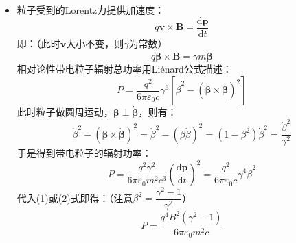\documentclass[a4paper,fontset=none]{ctexart}
\begin{document}
\begin{itemize}
\begin{align*}
        &= \frac{F^2}{\delta^2} - \frac{1}{\delta^2} (\bm{\beta} \cdot \bm{F})^2 - \frac{1}{\gamma^2} \left[(\hat{r} \cdot \bm{F})^2 + (\bm{\beta} \cdot \bm{F})^2 - 2 (\hat{r} \cdot \bm{F}) (\bm{\beta} \cdot \bm{F})\right] \\
        &= \frac{\bm{F}^2}{\delta^2} - \frac{1}{\delta^2}(\bm{\beta} \cdot \bm{F})^2 - \frac{1}{\gamma^2}(\hat{r} \cdot \bm{F} - \bm{\beta} \cdot \bm{F})^2
    \end{align*}
    故带电粒子辐射功率的角分布公式：
    \[
        \frac{\mathrm{d}P}{\mathrm{d}\varOmega} = \frac{q^2}{16\pi^2\varepsilon_0c^3} \frac{\left[\hat{r} \times (\hat{r}-\bm{\beta}) \times \dot{\bm{v}}\right]^2}{(1 - \bm{\beta} \cdot \hat{r})^5} = \frac{q^2}{16\pi^2\varepsilon_0c^3} \cdot \delta^5\left[\hat{r} \times (\hat{r}-\bm{\beta}) \times \dot{\bm{v}}\right]^2
    \]
    用作用力可以表示为：
    \[
        \frac{\mathrm{d}P}{\mathrm{d}\varOmega} = \frac{q^2}{16\pi^2\varepsilon_0c^3} \cdot \frac{\delta^3}{\gamma^2m^2}\left[\bm{F}^2 - (\bm{\beta} \cdot \bm{F})^2 - \frac{\delta^2}{\gamma^2}(\hat{r} \cdot \bm{F} - \bm{\beta} \cdot \bm{F})^2\right]
    \]
    其中$\delta=\dfrac{1}{1-\hat{r}\cdot\bm{\beta}}$。

    \item[9.(1)]
    \setcounter{equation}{0}
    粒子受到的Lorentz力提供加速度：
    \begin{equation}
        q\bm{v} \times \bm{B} = \frac{\mathrm{d}\bm{p}}{\mathrm{d}t}
    \end{equation}
    即：（此时$\bm{v}$大小不变，则$\gamma$为常数）
    \begin{equation}
        q\bm{\beta} \times \bm{B} = \gamma m\dot{\bm{\beta}}
    \end{equation}
    相对论性带电粒子辐射总功率用Li\'{e}nard公式描述：
    \[
        P = \frac{q^2}{6\pi\varepsilon_0c}\gamma^6\left[\dot{\beta}^2 - (\bm{\beta} \times \dot{\bm{\beta}})^2\right]
    \]
    此时粒子做圆周运动，$\bm{\beta}\perp\dot{\bm{\beta}}$，则有：
    \[
        \dot{\beta}^2 - (\bm{\beta} \times \dot{\bm{\beta}})^2 = \dot{\beta}^2 - (\beta\dot{\beta})^2 = (1 - \beta^2)\dot{\beta}^2 = \frac{\dot{\beta}^2}{\gamma^2}
    \]
    于是得到带电粒子的辐射功率：
    \[
        P = \frac{q^2\gamma^2}{6\pi\varepsilon_0m^2c^3}\left(\frac{\mathrm{d}\bm{p}}{\mathrm{d}t}\right)^2 = \frac{q^2}{6\pi\varepsilon_0c}\gamma^4\dot{\beta}^2
    \]
    代入(1)或(2)式即得：（注意$\beta^2=\dfrac{\gamma^2-1}{\gamma^2}$）
    \[
        P = \frac{q^4B^2(\gamma^2-1)}{6\pi\varepsilon_0m^2c}
    \]


\end{itemize}
\end{document}
